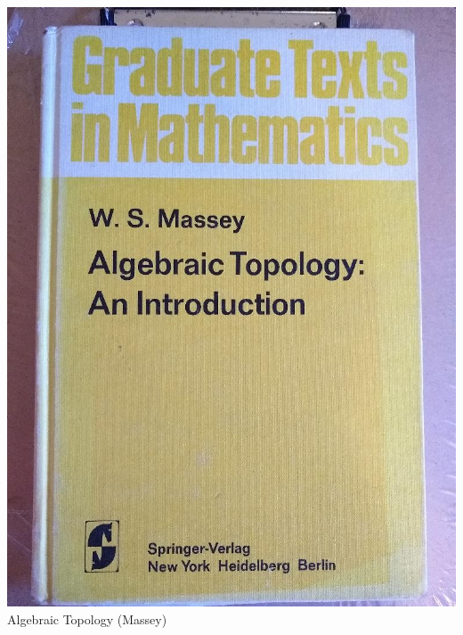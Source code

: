 \documentclass[t]{beamer}
\newcommand{\htarget}[2]{\hypertarget{#1}{#2}}
\begin{document}
\begin{frame}\htarget{ATM}{} \begin{center}
\includegraphics[height=0.8\textheight]{Algebraic_Topology_Massey_mini.jpg} \\
Algebraic Topology (Massey)
\end{center} \end{frame}
\end{document}
